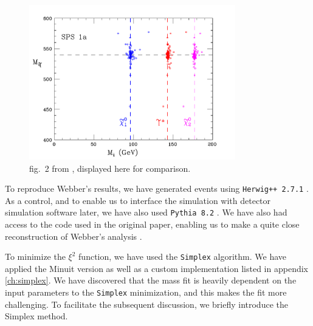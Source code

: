\documentclass[twoside,english]{uiofysmaster}
\begin{document}
\begin{figure}[hbt]
	\centering
	\includegraphics[width=0.8\textwidth]{figures/webber_rec_table/webber_scatter.png} 
	\caption{fig.\ 2 from \cite{Webber:2009vm}, displayed here for comparison.}
	\label{fig:webber_scatter}
\end{figure}


To reproduce Webber's results, we have generated events using {\tt Herwig++ 2.7.1} \cite{Bahr:2008pv}. As a control, and to enable us to interface the simulation with detector simulation software later, we have also used {\tt Pythia 8.2} \cite{Sjostrand:2014zea}. We have also had access to the code used in the original paper, enabling us to make a quite close reconstruction of Webber's analysis \cite{Webber:epost}. 

To minimize the $\xi^2$ function, we have used the {\tt Simplex} algorithm. We have applied the Minuit version as well as a custom implementation listed in appendix \ref{ch:simplex}. We have discovered that the mass fit is heavily dependent on the input parameters to the {\tt Simplex} minimization, and this makes the fit more challenging. To facilitate the subsequent discussion, we briefly introduce the Simplex method.
\end{document}
